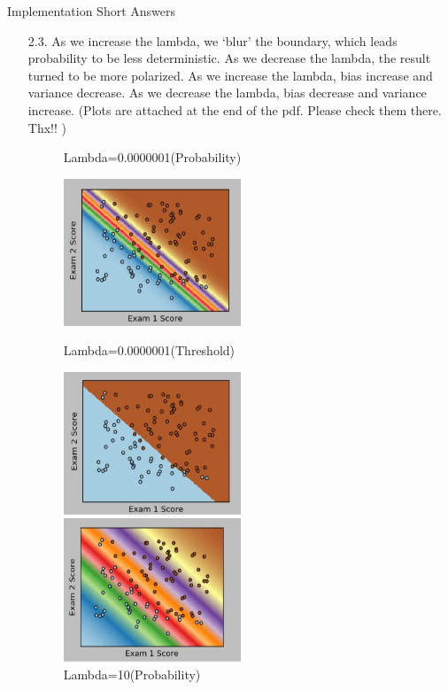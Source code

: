 \documentclass[12pt]{article}
\begin{document}
Implementation Short Answers


\begin{itemize}

\item[2.3. ] \smallskip As we increase the lambda, we ‘blur’ the boundary, which leads probability to be less deterministic. As we decrease the lambda, the result turned to be more polarized. As we increase the lambda, bias increase and variance decrease. As we decrease the lambda, bias decrease and variance increase. (Plots are attached at the end of the pdf. Please check them there. Thx!! )


\begin{figure}[h]
\caption{Lambda=0.0000001(Probability)}
\centering
\includegraphics[width=0.5\textwidth]{l01p}

\caption{Lambda=0.0000001(Threshold)}
\centering
\includegraphics[width=0.5\textwidth]{l01t}

\caption{Lambda=10(Probability)}
\centering
\includegraphics[width=0.5\textwidth]{l10p}
\end{figure}


\end{itemize}
\end{document}
